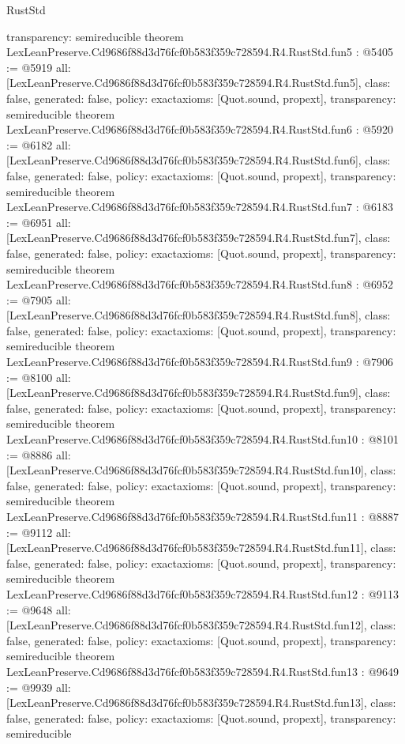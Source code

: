 \begin{lexlean}{RustStd}
\begin{coremodule}
{  transparency: semireducible
}
theorem LexLeanPreserve.Cd9686f88d3d76fcf0b583f359c728594.R4.RustStd.fun5 : @5405 := @5919 {
  all: [LexLeanPreserve.Cd9686f88d3d76fcf0b583f359c728594.R4.RustStd.fun5],
  class: false,
  generated: false,
  policy: exact{axioms: [Quot.sound, propext]},
  transparency: semireducible
}
theorem LexLeanPreserve.Cd9686f88d3d76fcf0b583f359c728594.R4.RustStd.fun6 : @5920 := @6182 {
  all: [LexLeanPreserve.Cd9686f88d3d76fcf0b583f359c728594.R4.RustStd.fun6],
  class: false,
  generated: false,
  policy: exact{axioms: [Quot.sound, propext]},
  transparency: semireducible
}
theorem LexLeanPreserve.Cd9686f88d3d76fcf0b583f359c728594.R4.RustStd.fun7 : @6183 := @6951 {
  all: [LexLeanPreserve.Cd9686f88d3d76fcf0b583f359c728594.R4.RustStd.fun7],
  class: false,
  generated: false,
  policy: exact{axioms: [Quot.sound, propext]},
  transparency: semireducible
}
theorem LexLeanPreserve.Cd9686f88d3d76fcf0b583f359c728594.R4.RustStd.fun8 : @6952 := @7905 {
  all: [LexLeanPreserve.Cd9686f88d3d76fcf0b583f359c728594.R4.RustStd.fun8],
  class: false,
  generated: false,
  policy: exact{axioms: [Quot.sound, propext]},
  transparency: semireducible
}
theorem LexLeanPreserve.Cd9686f88d3d76fcf0b583f359c728594.R4.RustStd.fun9 : @7906 := @8100 {
  all: [LexLeanPreserve.Cd9686f88d3d76fcf0b583f359c728594.R4.RustStd.fun9],
  class: false,
  generated: false,
  policy: exact{axioms: [Quot.sound, propext]},
  transparency: semireducible
}
theorem LexLeanPreserve.Cd9686f88d3d76fcf0b583f359c728594.R4.RustStd.fun10 : @8101 := @8886 {
  all: [LexLeanPreserve.Cd9686f88d3d76fcf0b583f359c728594.R4.RustStd.fun10],
  class: false,
  generated: false,
  policy: exact{axioms: [Quot.sound, propext]},
  transparency: semireducible
}
theorem LexLeanPreserve.Cd9686f88d3d76fcf0b583f359c728594.R4.RustStd.fun11 : @8887 := @9112 {
  all: [LexLeanPreserve.Cd9686f88d3d76fcf0b583f359c728594.R4.RustStd.fun11],
  class: false,
  generated: false,
  policy: exact{axioms: [Quot.sound, propext]},
  transparency: semireducible
}
theorem LexLeanPreserve.Cd9686f88d3d76fcf0b583f359c728594.R4.RustStd.fun12 : @9113 := @9648 {
  all: [LexLeanPreserve.Cd9686f88d3d76fcf0b583f359c728594.R4.RustStd.fun12],
  class: false,
  generated: false,
  policy: exact{axioms: [Quot.sound, propext]},
  transparency: semireducible
}
theorem LexLeanPreserve.Cd9686f88d3d76fcf0b583f359c728594.R4.RustStd.fun13 : @9649 := @9939 {
  all: [LexLeanPreserve.Cd9686f88d3d76fcf0b583f359c728594.R4.RustStd.fun13],
  class: false,
  generated: false,
  policy: exact{axioms: [Quot.sound, propext]},
  transparency: semireducible
}
\end{coremodule}
\end{lexlean}
